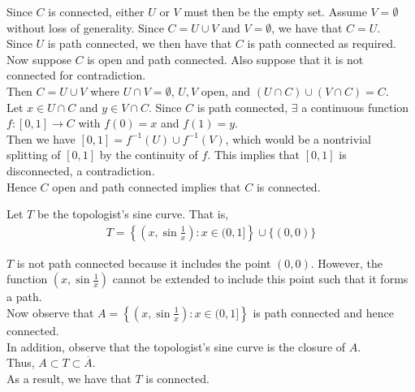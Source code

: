 \documentclass[12pt]{article}
\newenvironment{problem}[2][Problem]{\begin{trivlist}
\item[\hskip \labelsep {\bfseries #1}\hskip \labelsep {\bfseries #2.}]}{\end{trivlist}}
\begin{document}
Since $C$ is connected, either $U$ or $V$ must then be the empty set. Assume $V = \emptyset$ without loss of generality. Since $C = U \cup V$ and $V = \emptyset$, we have that $C = U$.\\

Since $U$ is path connected, we then have that $C$ is path connected as required.\\

Now suppose $C$ is open and path connected. Also suppose that it is not connected for contradiction.\\

Then $C = U \cup V$ where $U \cap V = \emptyset$, $U, V$ open, and $(U \cap C) \cup (V \cap C) = C$.\\

Let $x \in U \cap C$ and $y \in V \cap C$. Since $C$ is path connected, $\exists$ a continuous function $f: [0, 1] \to C$ with $f(0) = x$ and $f(1) = y$.\\

Then we have $[0, 1] = f^{-1}(U) \cup f^{-1}(V)$, which would be a nontrivial splitting of $[0, 1]$ by the continuity of $f$. This implies that $[0, 1]$ is disconnected, a contradiction.\\

Hence $C$ open and path connected implies that $C$ is connected.

\begin{problem}{4}
\end{problem}

\begin{problem}{5}
\end{problem}

Let $T$ be the topologist's sine curve. That is,
\begin{align*}
T = \left\{  \left( x, \sin \tfrac{1}{x}  \right ) :  x \in (0,1] \right\} \cup \{(0,0)\}
\end{align*}

$T$ is not path connected because it includes the point $(0, 0)$. However, the function $\left( x, \sin \tfrac{1}{x}  \right )$ cannot be extended to include this point such that it forms a path.\\

Now observe that $A = \left\{  \left( x, \sin \tfrac{1}{x}  \right ) :  x \in (0,1] \right\}$ is path connected and hence connected.\\

In addition, observe that the topologist's sine curve is the closure of $A$.\\

Thus, $A \subset T \subset \overline{A}$.\\

As a result, we have that $T$ is connected.
\end{document}
